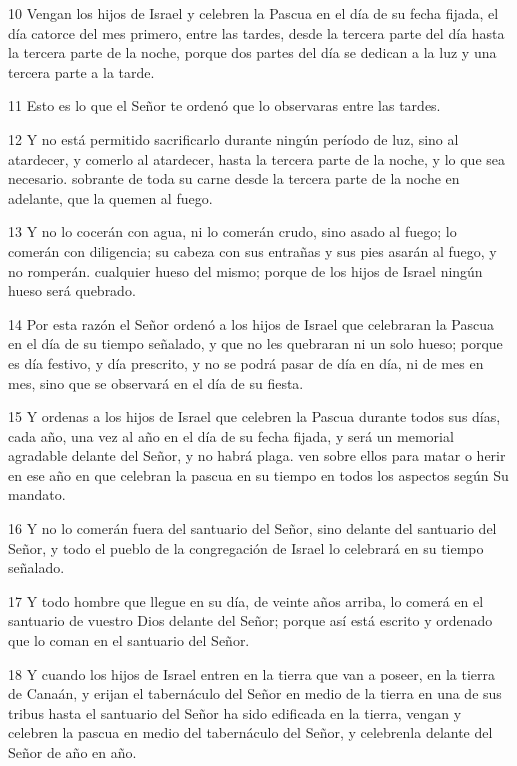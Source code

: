 \par 10 Vengan los hijos de Israel y celebren la Pascua en el día de su fecha fijada, el día catorce del mes primero, entre las tardes, desde la tercera parte del día hasta la tercera parte de la noche, porque dos partes del día se dedican a la luz y una tercera parte a la tarde.
\par 11 Esto es lo que el Señor te ordenó que lo observaras entre las tardes.
\par 12 Y no está permitido sacrificarlo durante ningún período de luz, sino al atardecer, y comerlo al atardecer, hasta la tercera parte de la noche, y lo que sea necesario. sobrante de toda su carne desde la tercera parte de la noche en adelante, que la quemen al fuego.
\par 13 Y no lo cocerán con agua, ni lo comerán crudo, sino asado al fuego; lo comerán con diligencia; su cabeza con sus entrañas y sus pies asarán al fuego, y no romperán. cualquier hueso del mismo; porque de los hijos de Israel ningún hueso será quebrado.
\par 14 Por esta razón el Señor ordenó a los hijos de Israel que celebraran la Pascua en el día de su tiempo señalado, y que no les quebraran ni un solo hueso; porque es día festivo, y día prescrito, y no se podrá pasar de día en día, ni de mes en mes, sino que se observará en el día de su fiesta.
\par 15 Y ordenas a los hijos de Israel que celebren la Pascua durante todos sus días, cada año, una vez al año en el día de su fecha fijada, y será un memorial agradable delante del Señor, y no habrá plaga. ven sobre ellos para matar o herir en ese año en que celebran la pascua en su tiempo en todos los aspectos según Su mandato.
\par 16 Y no lo comerán fuera del santuario del Señor, sino delante del santuario del Señor, y todo el pueblo de la congregación de Israel lo celebrará en su tiempo señalado.
\par 17 Y todo hombre que llegue en su día, de veinte años arriba, lo comerá en el santuario de vuestro Dios delante del Señor; porque así está escrito y ordenado que lo coman en el santuario del Señor.
\par 18 Y cuando los hijos de Israel entren en la tierra que van a poseer, en la tierra de Canaán, y erijan el tabernáculo del Señor en medio de la tierra en una de sus tribus hasta el santuario del Señor ha sido edificada en la tierra, vengan y celebren la pascua en medio del tabernáculo del Señor, y celebrenla delante del Señor de año en año.
